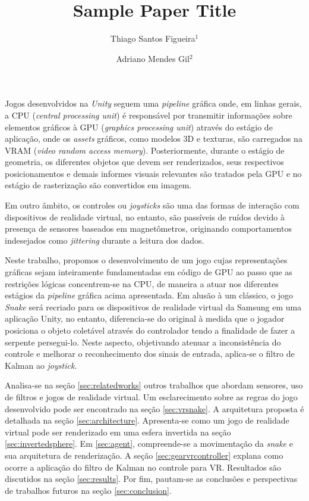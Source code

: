 \documentclass{vgtc}                          %
\title{Sample Paper Title}
\author{Thiago Santos Figueira$^{1}$
\and Adriano Mendes Gil$^{2}$}
\affiliation{\scriptsize $^{1}$Research institute X, Department, Country\\
$^{2}$University B, Department, Country\\
$^{3}$Company C, Department, Country}
\begin{document}

\maketitle

Jogos desenvolvidos na \textit{Unity} seguem uma \textit{pipeline} gráfica onde, em linhas gerais, a CPU (\textit{central processing unit}) é responsável por transmitir informações sobre elementos gráficos à GPU (\textit{graphics processing unit}) através do estágio de aplicação, onde os \textit{assets} gráficos, como modelos 3D e texturas, são carregados na VRAM (\textit{video random access memory}). Posteriormente, durante o estágio de geometria, os diferentes objetos que devem ser renderizados, seus respectivos posicionamentos e demais informes visuais relevantes são tratados pela GPU e no estágio de rasterização são convertidos em imagem\cite{akenine2008real}.

Em outro âmbito, os controles ou \textit{joysticks} são uma das formas de interação com dispositivos de realidade virtual, no entanto, são passíveis de ruídos devido à presença de sensores baseados em magnetômetros, originando comportamentos indesejados como \textit{jittering} durante a leitura dos dados. 

Neste trabalho, propomos o desenvolvimento de um jogo cujas representações gráficas sejam inteiramente fundamentadas em código de GPU ao passo que as restrições lógicas concentrem-se na CPU, de maneira a atuar nos diferentes estágios da \textit{pipeline} gráfica acima apresentada. Em alusão à um clássico, o jogo \textit{Snake} será recriado para os dispositivos de realidade virtual da Samsung em uma aplicação Unity, no entanto, diferencia-se do original à medida que o jogador posiciona o objeto coletável através do controlador tendo a finalidade de fazer a serpente persegui-lo. Neste aspecto, objetivando atenuar a inconsistência do controle e melhorar o reconhecimento dos sinais de entrada, aplica-se o filtro de Kalman ao \textit{joystick}.

Analisa-se na seção \ref{sec:relatedworks} outros trabalhos que abordam sensores, uso de filtros e jogos de realidade virtual. Um esclarecimento sobre as regras do jogo desenvolvido pode ser encontrado na seção \ref{sec:vrsnake}. A arquitetura proposta é detalhada na seção \ref{sec:architecture}. Apresenta-se como um jogo de realidade virtual pode ser renderizado em uma esfera invertida na seção \ref{sec:invertedsphere}. Em \ref{sec:agent}, compreende-se a movimentação da \textit{snake} e sua arquitetura de renderização. A seção \ref{sec:gearvrcontroller} explana como ocorre a aplicação do filtro de Kalman no controle para VR. Resultados são discutidos na seção \ref{sec:results}. Por fim, pautam-se as conclusões e perspectivas de trabalhos futuros na seção \ref{sec:conclusion}.
\end{document}
